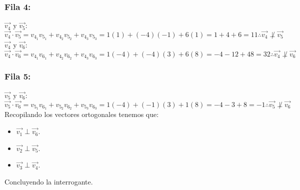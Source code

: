 \documentclass[letterpaper, 12pt]{article}
\begin{document}
\subsubsection*{Fila 4:}
\justify
\(\vec{v_4} \text{ y }\vec{v_5}\):\\ \newline
\(\vec{v_4}\cdot\vec{v_5}=v_{4_1}v_{5_1}+v_{4_2}v_{5_2}+v_{4_3}v_{5_3}=1(1)+(-4)(-1)+6(1)=1+4+6=11\therefore\vec{v_4}\not\perp \vec{v_5}\)\\ \newline
\(\vec{v_4} \text{ y }\vec{v_6}\):\\ \newline
\(\vec{v_4}\cdot\vec{v_6}=v_{4_1}v_{6_1}+v_{4_2}v_{6_2}+v_{4_3}v_{6_3}=1(-4)+(-4)(3)+6(8)=-4-12+48=32\therefore\vec{v_4}\not\perp \vec{v_6}\)
\subsubsection*{Fila 5:}
\justify
\(\vec{v_5} \text{ y }\vec{v_6}\):\\ \newline
\(\vec{v_5}\cdot\vec{v_6}=v_{5_1}v_{6_1}+v_{5_2}v_{6_2}+v_{5_3}v_{6_3}=1(-4)+(-1)(3)+1(8)=-4-3+8=-1\therefore\vec{v_5}\not\perp \vec{v_6}\)\\ \newline
Recopilando los vectores ortogonales tenemos que:
\begin{itemize}
    \item \(\vec{v_1}\perp \vec{v_6}\).
    \item \(\vec{v_2}\perp \vec{v_5}\).
    \item \(\vec{v_3}\perp \vec{v_4}\).
\end{itemize}
Concluyendo la interrogante.
\end{document}
